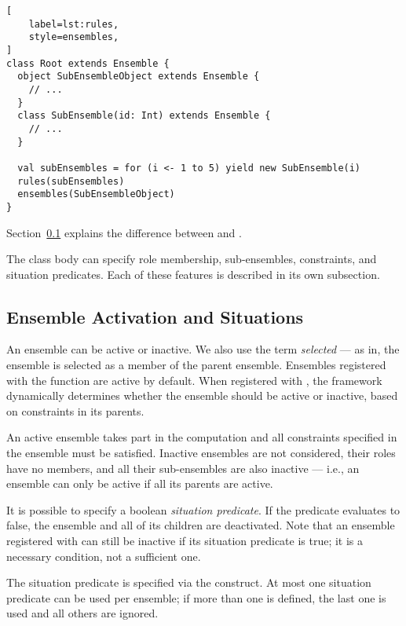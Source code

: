 \begin{lstlisting}[
    label=lst:rules,
    style=ensembles,
]
class Root extends Ensemble {
  object SubEnsembleObject extends Ensemble {
    // ...
  }
  class SubEnsemble(id: Int) extends Ensemble {
    // ...
  }

  val subEnsembles = for (i <- 1 to 5) yield new SubEnsemble(i)
  rules(subEnsembles)
  ensembles(SubEnsembleObject)
}
\end{lstlisting}

Section~\ref{dsl:c:situations} explains the difference between  and
.

The class body can specify role membership, sub-ensembles, constraints, and situation
predicates. Each of these features is described in its own subsection.


\subsection{Ensemble Activation and Situations}
\label{dsl:c:situations}

An ensemble can be active or inactive. We also use the term \textit{selected} --- as in,
the ensemble is selected as a member of the parent ensemble. Ensembles registered with
the  function are active by default. When registered with , the
framework dynamically determines whether the ensemble should be active or inactive,
based on constraints in its parents. 

An active ensemble takes part in the computation and all constraints specified in the
ensemble must be satisfied. Inactive ensembles are not considered, their roles have no
members, and all their sub-ensembles are also inactive --- i.e., an ensemble can only be
active if all its parents are active.

It is possible to specify a boolean \textit{situation predicate}. If the predicate
evaluates to false, the ensemble and all of its children are deactivated. Note that an
ensemble registered with  can still be inactive if its situation predicate
is true; it is a necessary condition, not a sufficient one.

The situation predicate is specified via the  construct. At most one
situation predicate can be used per ensemble; if more than one  is
defined, the last one is used and all others are ignored.


